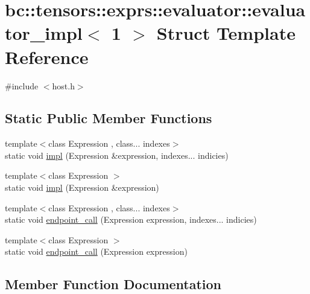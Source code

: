 \hypertarget{structbc_1_1tensors_1_1exprs_1_1evaluator_1_1evaluator__impl_3_011_01_4}{}\section{bc\+:\+:tensors\+:\+:exprs\+:\+:evaluator\+:\+:evaluator\+\_\+impl$<$ 1 $>$ Struct Template Reference}
\label{structbc_1_1tensors_1_1exprs_1_1evaluator_1_1evaluator__impl_3_011_01_4}


{\ttfamily \#include $<$host.\+h$>$}

\subsection*{Static Public Member Functions}
\begin{DoxyCompactItemize}
\item 
{\footnotesize template$<$class Expression , class... indexes$>$ }\\static void \hyperlink{structbc_1_1tensors_1_1exprs_1_1evaluator_1_1evaluator__impl_3_011_01_4_a3bc9b997d12db98fd689c6e620a22860}{impl} (Expression \&expression, indexes... indicies)
\item 
{\footnotesize template$<$class Expression $>$ }\\static void \hyperlink{structbc_1_1tensors_1_1exprs_1_1evaluator_1_1evaluator__impl_3_011_01_4_ae5cc9c326c201aefa9d1dafa077b5dc9}{impl} (Expression \&expression)
\item 
{\footnotesize template$<$class Expression , class... indexes$>$ }\\static void \hyperlink{structbc_1_1tensors_1_1exprs_1_1evaluator_1_1evaluator__impl_3_011_01_4_a1be6f6988dfc111b3d1afa394299ef4f}{endpoint\+\_\+call} (Expression expression, indexes... indicies)
\item 
{\footnotesize template$<$class Expression $>$ }\\static void \hyperlink{structbc_1_1tensors_1_1exprs_1_1evaluator_1_1evaluator__impl_3_011_01_4_aa4c040a0e81aae56e4a3a4cbd7670f7a}{endpoint\+\_\+call} (Expression expression)
\end{DoxyCompactItemize}


\subsection{Member Function Documentation}
\mbox{\label{structbc_1_1tensors_1_1exprs_1_1evaluator_1_1evaluator__impl_3_011_01_4_a1be6f6988dfc111b3d1afa394299ef4f}} 
